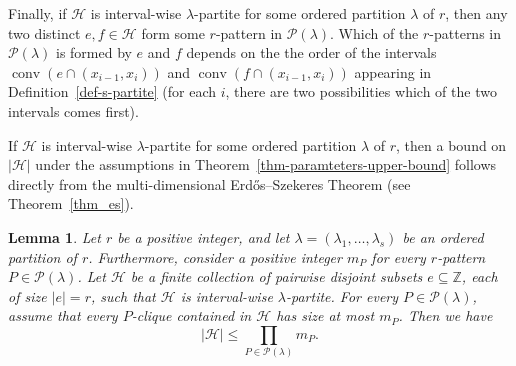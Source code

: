 \documentclass[11pt]{article}
\newtheorem{lemma}[theorem]{Lemma}
\theoremstyle{definition}
\numberwithin{equation}{section}
\numberwithin{figure}{section}
\newcommand{\su}{\subseteq}
\newcommand{\Z}{\mathbb{Z}}
\newcommand{\HH}{\mathcal{H}}
\newcommand{\conv}{\operatorname{conv}}
\newcommand{\PP}{\mathcal{P}}
\begin{document}
Finally, if $\HH$ is interval-wise $\lambda$-partite for some ordered partition $\lambda$ of $r$, then any two distinct $e,f\in\HH$ form some $r$-pattern in $\PP(\lambda)$. Which of the $r$-patterns in $\PP(\lambda)$ is formed by $e$ and $f$ depends on the the order of the intervals $\conv(e\cap (x_{i-1},x_i))$ and $\conv(f\cap (x_{i-1},x_i))$ appearing in Definition~\ref{def-s-partite} (for each $i$, there are two possibilities which of the two intervals comes first).

If $\HH$ is interval-wise $\lambda$-partite for some ordered partition $\lambda$ of $r$, then a bound on $|\HH|$ under the assumptions in Theorem~\ref{thm-paramteters-upper-bound} follows directly from the multi-dimensional Erd\H{o}s--Szekeres Theorem (see Theorem~\ref{thm_es}). 

\begin{lemma}\label{obs-interval-wise}
Let $r$ be a positive integer, and let $\lambda=(\lambda_1,\dots,\lambda_s)$ be an ordered partition of $r$. Furthermore, consider a positive integer $m_P$ for every $r$-pattern $P\in \PP(\lambda)$. Let $\HH$ be a finite collection of pairwise disjoint subsets $e\su \Z$, each of size $|e|=r$, such that $\HH$ is interval-wise $\lambda$-partite. For every $P\in \PP(\lambda)$, assume that every $P$-clique contained in $\HH$ has size at most $m_{P}$. Then we have
\[|\HH|\le \prod_{P\in \PP(\lambda)} m_{P}.\]
\end{lemma}
\end{document}
